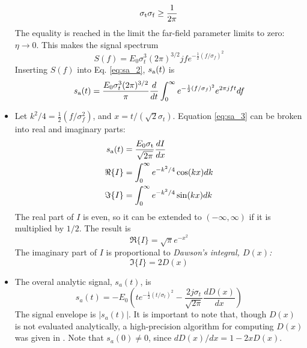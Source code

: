 \documentclass[amsmath,amssymb,aps,prd,10pt,twocolumn,showkeys]{revtex4}
\begin{document}
\begin{itemize}
\begin{equation}
\sigma_{\rm t} \sigma_{\rm f} \geq \frac{1}{2\pi}
\end{equation}
The equality is reached in the limit the far-field parameter limits to zero: $\eta \to 0$.  This makes the signal spectrum
\begin{equation}
S(f) = E_0 \sigma_t^3 (2\pi)^{3/2} j f e^{-\frac{1}{2}\left(f/\sigma_f\right)^2}
\end{equation}
Inserting $S(f)$ into Eq. \ref{eq:sa_2}, $s_{\rm a}(t)$ is
\begin{equation}
s_{\rm a}(t) = \frac{E_0 \sigma_t^3 (2\pi)^{3/2}}{\pi} \frac{d}{dt}\int_0^{\infty} e^{-\frac{1}{2}\left(f/\sigma_f\right)^2} e^{2\pi j f t} df \label{eq:sa_3}
\end{equation}
\item Let $k^2/4 = \frac{1}{2}\left(f/\sigma_f^2\right)$, and $x = t/(\sqrt{2}\sigma_t)$.  Equation \ref{eq:sa_3} can be broken into real and imaginary parts:
\begin{align}
s_{\rm a}(t) &= \frac{E_0 \sigma_{\rm t}}{\sqrt{2\pi}}\frac{dI}{dx} \\
\Re\lbrace I \rbrace &= \int_0^{\infty} e^{-k^2/4}\cos(kx) dk \\
\Im\lbrace I \rbrace &= \int_0^{\infty} e^{-k^2/4}\sin(kx) dk
\end{align}
The real part of $I$ is even, so it can be extended to $(-\infty,\infty)$ if it is multiplied by $1/2$.  The result is
\begin{equation}
\Re\lbrace I \rbrace = \sqrt{\pi} e^{-x^2}
\end{equation}
The imaginary part of $I$ is proportional to \textit{Dawson's integral, $D(x)$:}
\begin{equation}
\Im\lbrace I\rbrace = 2 D(x)
\end{equation}
\item The overal analytic signal, $s_a(t)$, is
\begin{equation}
s_a(t) = -E_0 \left(t e^{-\frac{1}{2}\left(t/\sigma_t\right)^2} - \frac{2 j\sigma_t}{\sqrt{2\pi}} \frac{dD(x)}{dx}\right) \label{eq:sa_4}
\end{equation}
The signal envelope is $|s_a(t)|$.  It is important to note that, though $D(x)$ is not evaluated analytically, a high-precision algorithm for computing $D(x)$ was given in \cite{10.1063/1.4822832}.  Note that $s_a(0) \neq 0$, since $dD(x)/dx = 1 - 2x D(x)$.

\end{itemize}
\end{document}
